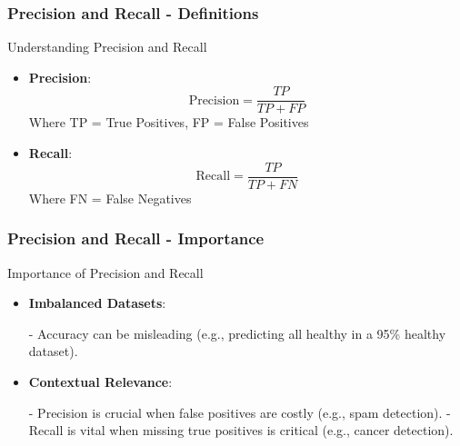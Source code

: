 \documentclass[aspectratio=169]{beamer}
\begin{document}
\begin{frame}[fragile]
    \frametitle{Precision and Recall - Definitions}
    \begin{block}{Understanding Precision and Recall}
        \begin{itemize}
            \item \textbf{Precision}: 
            \[
            \text{Precision} = \frac{TP}{TP + FP}
            \]
            Where TP = True Positives, FP = False Positives
            
            \item \textbf{Recall}: 
            \[
            \text{Recall} = \frac{TP}{TP + FN}
            \]
            Where FN = False Negatives
        \end{itemize}
    \end{block}
\end{frame}

\begin{frame}[fragile]
    \frametitle{Precision and Recall - Importance}
    \begin{block}{Importance of Precision and Recall}
        \begin{itemize}
            \item \textbf{Imbalanced Datasets}: 
            \begin{itemize}
                - Accuracy can be misleading (e.g., predicting all healthy in a 95\% healthy dataset).
            \end{itemize}
            \item \textbf{Contextual Relevance}: 
            \begin{itemize}
                - Precision is crucial when false positives are costly (e.g., spam detection).
                - Recall is vital when missing true positives is critical (e.g., cancer detection).
            \end{itemize}
        \end{itemize}
    \end{block}
\end{frame}
\end{document}
